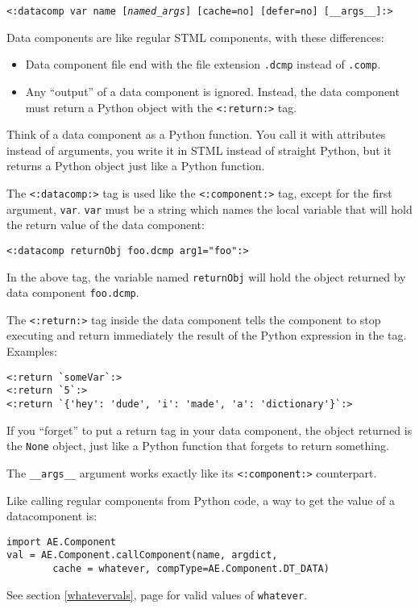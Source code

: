 \documentclass{manual}
\begin{document}
\texttt{<:datacomp var name [\emph{named_args}] [cache=no] [defer=no] [__args__]:>}

Data components are like regular STML components, with these differences:

\begin{itemize}
\item Data component file end with the file extension \texttt{.dcmp}
instead of \texttt{.comp}.

\item 
Any ``output'' of a data component is ignored. Instead, the data
component must return a Python object with the \texttt{<:return:>}
tag.

\end{itemize}


Think of a data component as a Python function. 
You call it with attributes instead of arguments, you write it 
in STML instead of straight Python, but it returns a Python 
object just like a Python function.

The \texttt{<:datacomp:>} tag is used like the 
\texttt{<:component:>} 
tag, except for the first argument, \texttt{var}. 
\texttt{var} must be a string which names the local 
variable that will hold the return value of the 
data component:

\begin{verbatim}<:datacomp returnObj foo.dcmp arg1="foo":>
\end{verbatim}

In the above tag, the variable named \texttt{returnObj} 
will hold the object returned by data component \texttt{foo.dcmp}.

The \texttt{<:return:>} tag inside the data component tells
the component to stop executing and return immediately
the result of the Python expression in the tag. Examples:

\begin{verbatim}<:return `someVar`:>
<:return `5`:>
<:return `{'hey': 'dude', 'i': 'made', 'a': 'dictionary'}`:>
\end{verbatim}

If you ``forget'' to put a return tag in your data component, 
the object returned is the \texttt{None} object, just like a Python 
function that forgets to return something.

The \texttt{__args__} argument works exactly like its
\texttt{<:component:>} counterpart.

Like calling regular components from Python code, a way to get the
value of a datacomponent is:
\begin{verbatim}
import AE.Component
val = AE.Component.callComponent(name, argdict, 	
        cache = whatever, compType=AE.Component.DT_DATA)
\end{verbatim}
See section \ref{whatevervals}, page \pageref{whatevervals} for valid
values of \texttt{whatever}.
\end{document}
